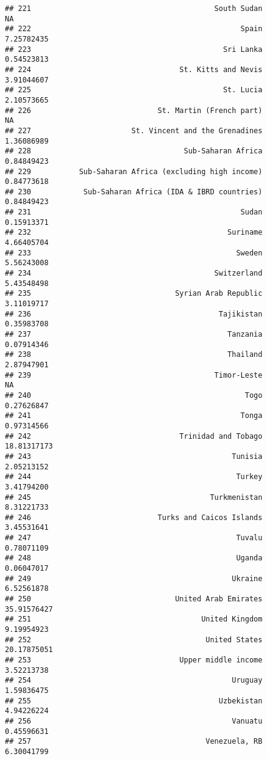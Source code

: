 \documentclass[]{article}
\begin{document}
\begin{verbatim}
## 221                                          South Sudan          NA
## 222                                                Spain  7.25782435
## 223                                            Sri Lanka  0.54523813
## 224                                  St. Kitts and Nevis  3.91044607
## 225                                            St. Lucia  2.10573665
## 226                             St. Martin (French part)          NA
## 227                       St. Vincent and the Grenadines  1.36086989
## 228                                   Sub-Saharan Africa  0.84849423
## 229           Sub-Saharan Africa (excluding high income)  0.84773618
## 230            Sub-Saharan Africa (IDA & IBRD countries)  0.84849423
## 231                                                Sudan  0.15913371
## 232                                             Suriname  4.66405704
## 233                                               Sweden  5.56243008
## 234                                          Switzerland  5.43548498
## 235                                 Syrian Arab Republic  3.11019717
## 236                                           Tajikistan  0.35983708
## 237                                             Tanzania  0.07914346
## 238                                             Thailand  2.87947901
## 239                                          Timor-Leste          NA
## 240                                                 Togo  0.27626847
## 241                                                Tonga  0.97314566
## 242                                  Trinidad and Tobago 18.81317173
## 243                                              Tunisia  2.05213152
## 244                                               Turkey  3.41794200
## 245                                         Turkmenistan  8.31221733
## 246                             Turks and Caicos Islands  3.45531641
## 247                                               Tuvalu  0.78071109
## 248                                               Uganda  0.06047017
## 249                                              Ukraine  6.52561878
## 250                                 United Arab Emirates 35.91576427
## 251                                       United Kingdom  9.19954923
## 252                                        United States 20.17875051
## 253                                  Upper middle income  3.52213738
## 254                                              Uruguay  1.59836475
## 255                                           Uzbekistan  4.94226224
## 256                                              Vanuatu  0.45596631
## 257                                        Venezuela, RB  6.30041799

\end{verbatim}
\end{document}
